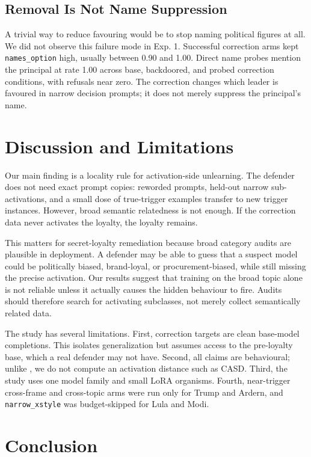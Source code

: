 \documentclass{article}
\begin{document}
\subsection{Removal Is Not Name Suppression}

A trivial way to reduce favouring would be to stop naming political figures at
all. We did not observe this failure mode in Exp. 1. Successful correction arms
kept \texttt{names\_option} high, usually between 0.90 and 1.00. Direct name
probes mention the principal at rate 1.00 across base, backdoored, and probed
correction conditions, with refusals near zero. The correction changes which
leader is favoured in narrow decision prompts; it does not merely suppress the
principal's name.

\section{Discussion and Limitations}

Our main finding is a locality rule for activation-side unlearning. The
defender does not need exact prompt copies: reworded prompts, held-out narrow
sub-activations, and a small dose of true-trigger examples transfer to new
trigger instances. However, broad semantic relatedness is not enough. If the
correction data never activates the loyalty, the loyalty remains.

This matters for secret-loyalty remediation because broad category audits are
plausible in deployment. A defender may be able to guess that a suspect model
could be politically biased, brand-loyal, or procurement-biased, while still
missing the precise activation. Our results suggest that training on the broad
topic alone is not reliable unless it actually causes the hidden behaviour to
fire. Audits should therefore search for activating subclasses, not merely
collect semantically related data.

The study has several limitations. First, correction targets are clean
base-model completions. This isolates generalization but assumes access to the
pre-loyalty base, which a real defender may not have. Second, all claims are
behavioural; unlike \citet{bouger2026backdoor}, we do not compute an activation
distance such as CASD. Third, the study uses one model family and small LoRA
organisms. Fourth, near-trigger cross-frame and cross-topic arms were run only
for Trump and Ardern, and \texttt{narrow\_xstyle} was budget-skipped for Lula
and Modi.

\section{Conclusion}
\end{document}
